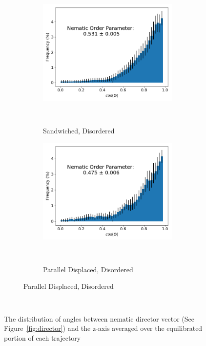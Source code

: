 \documentclass[journal=jpcbfk,manusciprt=article]{achemso}
\begin{document}
\begin{figure}[!htb]
\begin{subfigure}{\linewidth}
\begin{subfigure}{0.45\linewidth}
        \end{subfigure}
        \begin{subfigure}{0.45\linewidth}
                \centering
                \includegraphics[width=\linewidth]{disorder_sandwich_nematic_order.png}
                \caption{Sandwiched, Disordered}~\label{fig:disorder_sandwich_nematic}
        \end{subfigure}%
        \begin{subfigure}{0.45\linewidth}
                \centering
                \includegraphics[width=\linewidth]{disorder_offset_nematic_order.png}
                \caption{Parallel Displaced, Disordered}~\label{fig:disorder_offset_nematic}
        \end{subfigure}

  \end{subfigure}
  \caption{The distribution of angles between nematic director vector (See
	  Figure~\ref{fig:director}) and the z-axis averaged over the equilibrated portion
	  of each trajectory}~\label{fig:nematic_distribution}
  \end{figure}
 
\end{document}
